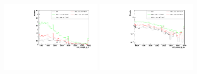 \begin{figure}[h]
  \begin{center}
	\includegraphics[width=0.45\textwidth]{Plots/aQGC_kinematics/vbf_maxpt_jj_m_FT2.pdf}%
	\includegraphics[width=0.45\textwidth]{Plots/aQGC_kinematics/vbf_maxpt_jj_m_FT2_log.pdf}\\
    \caption{}
  \end{center}
\end{figure}
